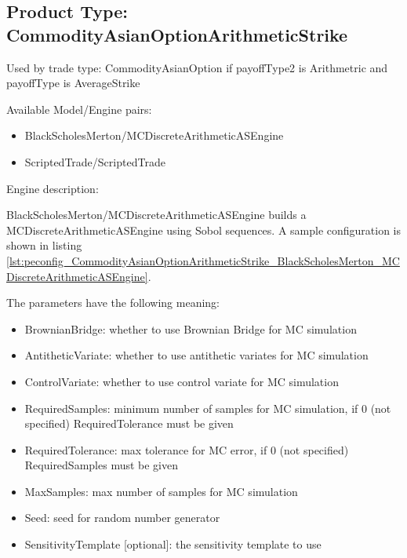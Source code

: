 \subsection{Product Type: CommodityAsianOptionArithmeticStrike}

Used by trade type: CommodityAsianOption if payoffType2 is Arithmetric and payoffType is AverageStrike

Available Model/Engine pairs:

\begin{itemize}
\item BlackScholesMerton/MCDiscreteArithmeticASEngine
\item ScriptedTrade/ScriptedTrade
\end{itemize}

Engine description:

BlackScholesMerton/MCDiscreteArithmeticASEngine builds a MCDiscreteArithmeticASEngine using Sobol sequences. A sample
configuration is shown in listing
\ref{lst:peconfig_CommodityAsianOptionArithmeticStrike_BlackScholesMerton_MCDiscreteArithmeticASEngine}.

The parameters have the following meaning:

\begin{itemize}
\item BrownianBridge: whether to use Brownian Bridge for MC simulation
\item AntitheticVariate: whether to use antithetic variates for MC simulation
\item ControlVariate: whether to use control variate for MC simulation
\item RequiredSamples: minimum number of samples for MC simulation, if 0 (not specified) RequiredTolerance must be given
\item RequiredTolerance: max tolerance for MC error, if 0 (not specified) RequiredSamples must be given
\item MaxSamples: max number of samples for MC simulation
\item Seed: seed for random number generator
\item SensitivityTemplate [optional]: the sensitivity template to use
\end{itemize}

